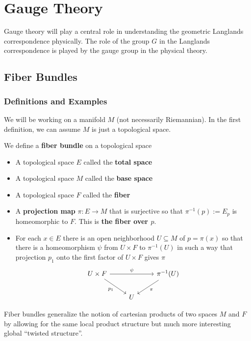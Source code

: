 \chapter{Gauge Theory\label{ch:gauge}}

	Gauge theory will play a central role in understanding the geometric Langlands correspondence physically. The role of the group $G$ in the Langlands correspondence is played by the gauge group in the physical theory. 

	\section{Fiber Bundles}
	\subsection{Definitions and Examples}
		We will be working on a manifold $M$ (not necessarily Riemannian). In the first definition, we can assume $M$ is just a topological space. 
	\begin{defn}
		We define a \textbf{fiber bundle} on a topological space
		\begin{itemize}
			\item A topological space $E$ called the \textbf{total space}
			\item A topological space $M$ called the \textbf{base space}
			\item A topological space $F$ called the \textbf{fiber} 
			\item A \textbf{projection map} $\pi: E \to M$ that is surjective so that $\pi^{-1}(p) := E_p$ is homeomorphic to $F$. This is \textbf{the fiber over $p$}.
			\item For each $x \in E$ there is an open neighborhood $U \subseteq M$ of $p = \pi(x)$ so that there is a homeomorphism $\psi$ from $U \times F$ to $\pi^{-1}(U)$ in such a way that projection $p_1$ onto the first factor of $U \times F$ gives $\pi$
			\[
			\begin{tikzcd}
				U \times F \arrow[rd,swap,"p_1"] \arrow[rr,"\psi"] && \pi^{-1}(U) \arrow[dl,"\pi"]\\
				& U &
			\end{tikzcd}
			\]
		\end{itemize}
	\end{defn}
	Fiber bundles generalize the notion of cartesian products of two spaces $M$ and $F$ by allowing for the same local product structure but much more interesting global ``twisted structure''. 
	
